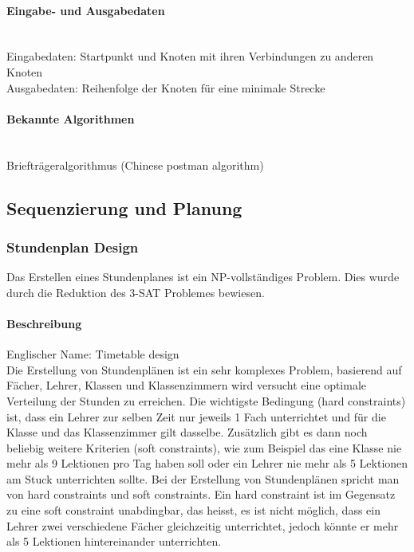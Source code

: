 	\paragraph{Eingabe- und Ausgabedaten}\mbox{}\\
	Eingabedaten: Startpunkt und Knoten mit ihren Verbindungen zu anderen Knoten\\
	Ausgabedaten: Reihenfolge der Knoten für eine minimale Strecke

	\paragraph{Bekannte Algorithmen}\mbox{}\\
	Briefträgeralgorithmus (Chinese postman algorithm)

\subsection{Sequenzierung und Planung}\label{sequencing_scheduling}

	\subsubsection{Stundenplan Design}\label{tsp}
	Das Erstellen eines Stundenplanes ist ein NP-vollständiges Problem. Dies wurde durch die Reduktion des 3-SAT Problemes bewiesen.

	\paragraph{Beschreibung}
	Englischer Name: Timetable design\\
	Die Erstellung von Stundenplänen ist ein sehr komplexes Problem, basierend auf Fächer, Lehrer, Klassen und Klassenzimmern wird versucht eine optimale Verteilung der Stunden zu erreichen. Die wichtigste Bedingung (hard constraints) ist, dass ein Lehrer zur selben Zeit nur jeweils 1 Fach unterrichtet und für die Klasse und das Klassenzimmer gilt dasselbe. Zusätzlich gibt es dann noch beliebig weitere Kriterien (soft constraints), wie zum Beispiel das eine Klasse nie mehr als 9 Lektionen pro Tag haben soll oder ein Lehrer nie mehr als 5 Lektionen am Stuck unterrichten sollte. Bei der Erstellung von Stundenplänen spricht man von hard constraints und soft constraints. Ein hard constraint ist im Gegensatz zu eine soft constraint unabdingbar, das heisst, es ist nicht möglich, dass ein Lehrer zwei verschiedene Fächer gleichzeitig unterrichtet, jedoch könnte er mehr als 5 Lektionen hintereinander unterrichten. \cite{Abramson92aparallel} \cite{Abramson91constructingschool} \cite{framework_timetabling} \cite{time_table_constraint_opti_ea}

